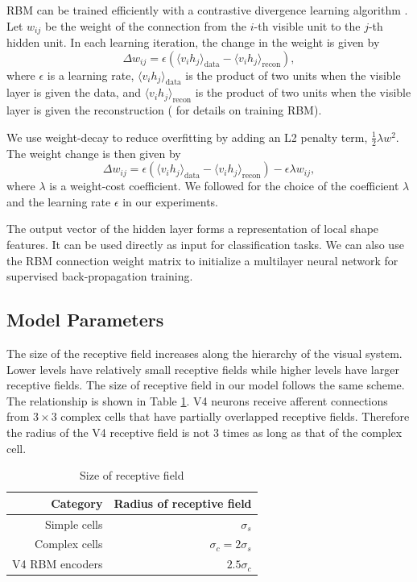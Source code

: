 \documentclass[conference]{IEEEtran}
\begin{document}
RBM can be trained efficiently with a contrastive divergence learning algorithm \cite{hinton2002}.
Let $w_{ij}$ be the weight of the connection from the $i$-th visible unit to the $j$-th hidden unit.
In each learning iteration, the change in the weight is given by
\begin{equation}
\Delta w_{ij}=\epsilon\left(\langle v_i h_j\rangle_\text{data}-\langle v_i h_j\rangle_\text{recon}\right),
\end{equation}
where $\epsilon$ is a learning rate, 
$\langle v_i h_j\rangle_\text{data}$ is the product of two units 
when the visible layer is given the data,
and $\langle v_i h_j\rangle_\text{recon}$ is the product of two units 
when the visible layer is given the reconstruction 
(\cite{hinton2002} for details on training RBM).

We use weight-decay \cite{hinton2010}
to reduce overfitting by adding an L2 penalty term, $\frac{1}{2}\lambda w^2$.
The weight change is then given by
\begin{equation}
\Delta w_{ij}=\epsilon\left(\langle v_i h_j\rangle_\text{data}-\langle v_i h_j\rangle_\text{recon}\right)
-\epsilon\lambda w_{ij},
\end{equation}
where $\lambda$ is a weight-cost coefficient.
We followed \cite{hinton2010} for the choice of the coefficient $\lambda$ and the learning rate $\epsilon$
in our experiments.

The output vector of the hidden layer forms a representation of local shape features.
It can be used directly as input for classification tasks.
We can also use the RBM connection weight matrix to initialize a multilayer neural network
for supervised back-propagation training.

\subsection{Model Parameters}

The size of the receptive field increases along the hierarchy of the visual system.
Lower levels have relatively small receptive fields while higher levels have larger receptive fields.
The size of receptive field in our model follows the same scheme.
The relationship is shown in Table \ref{tab:1}.
V4 neurons receive afferent connections from $3\times3$ complex cells
that have partially overlapped receptive fields.
Therefore the radius of the V4 receptive field is not 3 times as long as that of the complex cell.

\begin{table}[h]
\caption{Size of receptive field}
\centering
\begin{tabular}{rr}
\toprule
Category & Radius of receptive field \\
\midrule
Simple cells & $\sigma_s$ \\
Complex cells & $\sigma_c = 2\sigma_s$ \\
V4 RBM encoders & $2.5\sigma_c$\\
\bottomrule
\end{tabular}
\label{tab:1}
\end{table}
\end{document}
